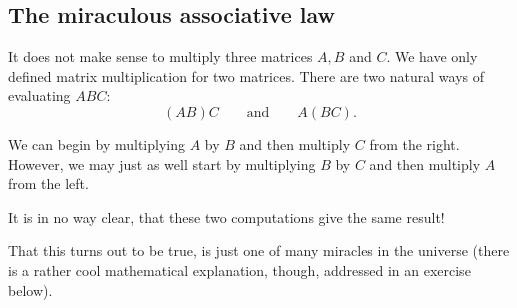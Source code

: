 \documentclass{article}
\begin{document}
\subsection{The miraculous associative law}

It does not make sense to multiply three matrices $A, B$ and $C$. We have only defined
matrix multiplication for two matrices. There are two natural ways of evaluating
$A B C$:
$$
( A B ) C\qquad \text{and}\qquad A (B C).
$$

We can begin by multiplying $A$ by $B$ and then multiply $C$ from the right.
However, we may just as well start by multiplying $B$ by $C$ and then
multiply $A$ from the left.

It is in no way clear, that these two computations give the same result!

That this turns out to be true, is just one of many miracles in the universe (there is a
rather cool mathematical explanation, though, addressed in an exercise below).
\end{document}
